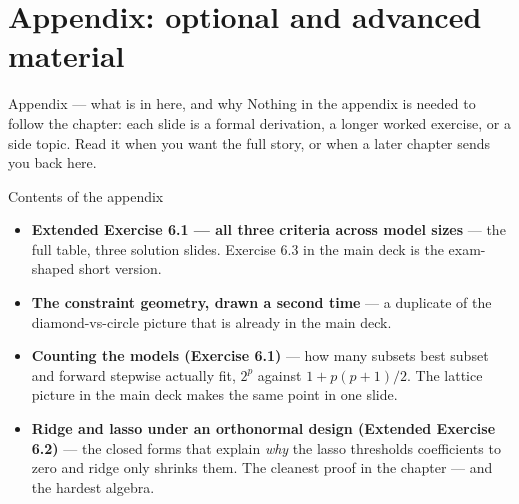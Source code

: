 \documentclass[aspectratio=169,11pt]{beamer}
\begin{document}
\appendix
\AtBeginSection[]{}
\section{Appendix: optional and advanced material}

\begin{frame}{Appendix --- what is in here, and why}
  \footnotesize
  Nothing in the appendix is needed to follow the chapter: each slide is a
  formal derivation, a longer worked exercise, or a side topic. Read it when
  you want the full story, or when a later chapter sends you back here.
  \begin{block}{Contents of the appendix}
    \begin{itemize}\itemsep2pt
      \item \textbf{Extended Exercise 6.1 --- all three criteria across model sizes} --- the full table, three solution slides. Exercise 6.3 in the main deck is the exam-shaped short version.
      \item \textbf{The constraint geometry, drawn a second time} --- a duplicate of the diamond-vs-circle picture that is already in the main deck.
      \item \textbf{Counting the models (Exercise 6.1)} --- how many subsets best subset and forward stepwise actually fit, $2^p$ against $1+p(p+1)/2$. The lattice picture in the main deck makes the same point in one slide.
      \item \textbf{Ridge and lasso under an orthonormal design (Extended Exercise 6.2)} --- the closed forms that explain \emph{why} the lasso thresholds coefficients to zero and ridge only shrinks them. The cleanest proof in the chapter --- and the hardest algebra.
    \end{itemize}
  \end{block}
\end{frame}
\end{document}
